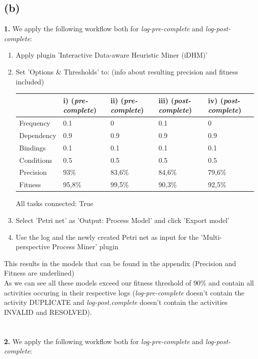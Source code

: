 \documentclass[../../main.tex]{subfiles}
\begin{document}
\subsection*{(b)}
\textbf{1.} We apply the following workflow both for \textit{log-pre-complete} and \textit{log-post-complete}:
\begin{enumerate}
\item Apply plugin 'Interactive Data-aware Heuristic Miner (iDHM)'
\item Set 'Options \& Thresholds' to: (info about resulting precision and fitness included)\\
\begin{table}[h!]
\begin{tabular}{l|llll}
           & i) (\textit{pre-complete}) & ii) (\textit{pre-complete}) & iii) (\textit{post-complete}) & iv) (\textit{post-complete})\\
           \hline
Frequency  & 0.1 & 0   & 0.1  & 0   \\
Dependency & 0.9 & 0.9 & 0.9  & 0.9 \\
Bindings   & 0.1 & 0.1 & 0.1  & 0.1 \\
Conditions & 0.5 & 0.5 & 0.5  & 0.5 \\
\hline
Precision & 93\%   & 83,6\% & 84,6\% & 79,6\% \\
Fitness   & 95,8\% & 99,5\% & 90,3\% & 92,5\% \\
\end{tabular}
\end{table}
All tasks connected: True
\item Select 'Petri net' as 'Output: Process Model' and click 'Export model'
\item Use the log and the newly created Petri net as input for the 'Multi-perspective Process Miner' plugin
\end{enumerate}
This results in the models that can be found in the appendix (Precision and Fitness are underlined)\\
As we can see all these models exceed our fitness threshold of 90\% and contain all activities occuring in their respective logs (\textit{log-pre-complete} doesn't contain the activity DUPLICATE and \textit{log-post.complete} doesn't contain the activities INVALID and RESOLVED).\\
\\ \ \\
\textbf{2.} We apply the following workflow both for \textit{log-pre-complete} and \textit{log-post-complete}:
\end{document}
